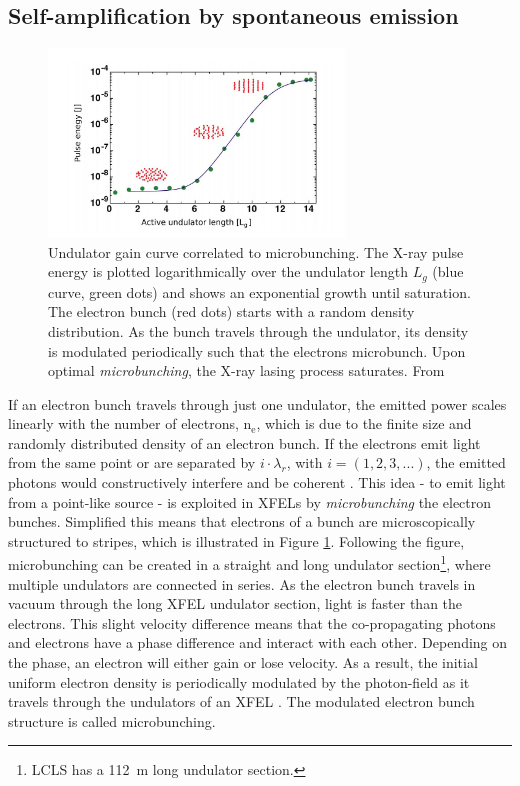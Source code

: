\subsection{Self-amplification by spontaneous emission}\label{sec:sase}
\begin{figure}
	\centering
		\includegraphics[width=0.7\textwidth]{images/gain-length.JPG}
	\caption[Undulator gain curve correlated to microbunching.]{Undulator gain curve correlated to microbunching. The X-ray pulse energy is plotted logarithmically over the undulator length $L_{g}$ (blue curve, green dots) and shows an exponential growth until saturation. The electron bunch (red dots) starts with a random density distribution. As the bunch travels through the undulator, its density is modulated periodically such that the electrons microbunch. Upon optimal \textit{microbunching}, the X-ray lasing process saturates. From \citep{Rupp-2013-Thesis,Rupp-2016-Springer}}
	\label{fig:gain-length}
\end{figure}
If an electron bunch travels through just one undulator, the emitted power scales linearly with the number of electrons, n$_{\text{e}}$, which is due to the finite size and randomly distributed density of an electron bunch. If the electrons emit light from the same point or are separated by $i\cdot \lambda_{r}$, with $i=\left(1, 2, 3, ...\right)$, the emitted photons would constructively interfere and be coherent \cite{Als-Nielson-2011-JWS}. This idea - to emit light from a point-like source - is exploited in XFELs by \textit{microbunching} the electron bunches. Simplified this means that electrons of a bunch are microscopically structured to stripes, which is illustrated in Figure \ref{fig:gain-length}. Following the figure, microbunching can be created in a straight and long undulator section\footnote{LCLS has a \SI{112}{\meter} long undulator section.}, where multiple undulators are connected in series. As the electron bunch travels in vacuum through the long XFEL undulator section, light is faster than the electrons. This slight velocity difference means that the co-propagating photons and electrons have a phase difference and interact with each other. Depending on the phase, an electron will either gain or lose velocity. As a result, the initial uniform electron density is periodically modulated by the photon-field as it travels through the undulators of an XFEL \cite{Huang-2007-PRSTAB}. The modulated electron bunch structure is called microbunching.\\[1\baselineskip]

